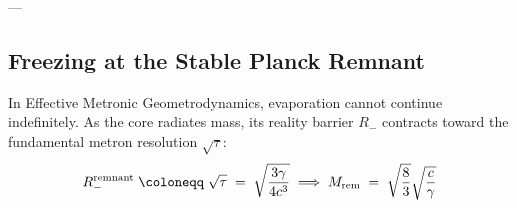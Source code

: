 \documentclass[
    12pt,
    a4paper,
    headings=normal,
    twoside=false,
    open=any,
    parskip=half
]{scrbook}
\let\hbar\relax
\begin{document}
---

\subsection{Freezing at the Stable Planck Remnant}

In Effective Metronic Geometrodynamics, evaporation cannot continue indefinitely. As the core radiates mass, its reality barrier $R_-$ contracts toward the fundamental metron resolution $\sqrt{\tau}$:
\begin{equation}
R_-^{\text{remnant}} \;\coloneqq\; \sqrt{\tau} \;=\; \sqrt{\frac{3\gamma\hbar}{4c^3}} \implies M_{\text{rem}} \;=\; \sqrt{\frac{8}{3}} \sqrt{\frac{\hbar c}{\gamma}}
\end{equation}

\end{document}

